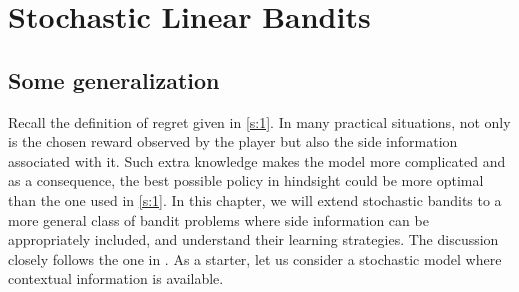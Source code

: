 \documentclass[10pt,a4article]{article}
\numberwithin{equation}{section}
\theoremstyle{plain}
\theoremstyle{definition}
\begin{document}
\newpage 

\section{Stochastic Linear Bandits}

\subsection{Some generalization}

Recall the definition of regret given in \eqref{s:1}. In many practical situations, not only is the chosen reward observed by the player but also the side information associated with it.  Such extra knowledge makes the model more complicated and as a consequence, the best possible policy in hindsight could be more optimal than the one used in \eqref{s:1}.  In this chapter, we will extend stochastic bandits to a more general class of bandit problems where side information can be appropriately included, and understand their learning strategies. The discussion closely follows the one in \cite{lattimore2018bandit}. 
As a starter, let us consider a stochastic model where contextual information is available. 
\end{document}
